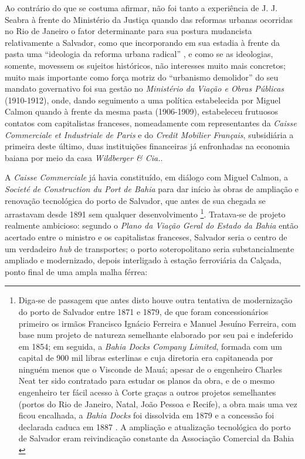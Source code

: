 Ao contrário do que se costuma afirmar, não foi tanto a experiência de J. J. Seabra à frente do Ministério da Justiça quando das reformas urbanas ocorridas no Rio de Janeiro o fator determinante para sua postura mudancista relativamente a Salvador, como que incorporando em sua estadia à frente da pasta uma ``ideologia da reforma urbana radical'' \cite{sampaio_formas_1999}, e como se as ideologias, somente, movessem os sujeitos históricos, não interesses muito mais concretos; muito mais importante como força motriz do ``urbanismo demolidor'' do seu mandato governativo foi sua gestão no \textit{Ministério da Viação e Obras Públicas} (1910-1912), onde, dando seguimento a uma política estabelecida por Miguel Calmon quando à frente da mesma pasta (1906-1909), estabeleceu frutuosos contatos com capitalistas franceses, nomeadamente com representantes da \textit{Caisse Commerciale et Industriale de Paris} e do \textit{Credit Mobilier Français}, subsidiária a primeira deste último, duas instituições financeiras já enfronhadas na economia baiana por meio da casa \textit{Wildberger \& Cia.}. 

A \textit{Caisse Commerciale} já havia constituído, em diálogo com Miguel Calmon, a \textit{Societé de Construction du Port de Bahia} para dar início às obras de ampliação e renovação tecnológica do porto de Salvador, que antes de sua chegada se arrastavam desde 1891 sem qualquer desenvolvimento \cite[p.~176-180]{rosado_porto_2016}\footnote{Diga-se de passagem que antes disto houve outra tentativa de modernização do porto de Salvador entre 1871 e 1879, de que foram concessionários primeiro os irmãos Francisco Ignácio Ferreira e Manuel Jesuíno Ferreira, com base num projeto de natureza semelhante elaborado por seu pai e indeferido em 1854; em seguida, a \textit{Bahia Docks Company Limited}, formada com um capital de 900 mil libras esterlinas e cuja diretoria era capitaneada por ninguém menos que o Visconde de Mauá; apesar de o engenheiro Charles Neat ter sido contratado para estudar os planos da obra, e de o mesmo engenheiro ter fácil acesso à Corte graças a outros projetos semelhantes (portos do Rio de Janeiro, Natal, João Pessoa e Recife), a obra mais uma vez ficou encalhada, a \textit{Bahia Docks} foi dissolvida em 1879 e a concessão foi declarada caduca em 1887 \cite[p.~175-176]{rosado_porto_2016}. A ampliação e atualização tecnológica do porto de Salvador eram reivindicação constante da Associação Comercial da Bahia \cite{CUNHA2011,joaci_porto_2016,rosado_porto_2016}}. Tratava-se de projeto realmente ambicioso: segundo o \textit{Plano da Viação Geral do Estado da Bahia} então acertado entre o ministro e os capitalistas franceses, Salvador seria o centro de um verdadeiro \textit{hub} de transportes; o porto soteropolitano seria substancialmente ampliado e modernizado, depois interligado à estação ferroviária da Calçada, ponto final de uma ampla malha férrea:

